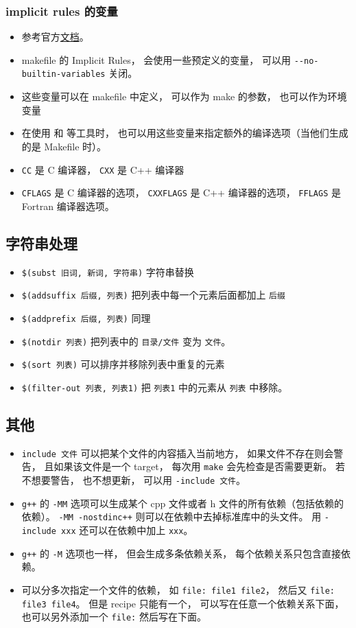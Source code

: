 \subsubsection{implicit rules 的变量}
\begin{itemize}
\item 参考官方\href{https://www.gnu.org/software/make/manual/html_node/Implicit-Variables.html}{文档}。
\item makefile 的 Implicit Rules， 会使用一些预定义的变量， 可以用 \verb`--no-builtin-variables` 关闭。
\item 这些变量可以在 makefile 中定义， 可以作为 make 的参数， 也可以作为环境变量
\item 在使用  和  等工具时， 也可以用这些变量来指定额外的编译选项（当他们生成的是 Makefile 时）。
\item \verb`CC` 是 C 编译器， \verb`CXX` 是 C++ 编译器
\item \verb`CFLAGS` 是 C 编译器的选项， \verb`CXXFLAGS` 是 C++ 编译器的选项， \verb`FFLAGS` 是 Fortran 编译器选项。
\end{itemize}

\subsection{字符串处理}
\begin{itemize}
\item \verb`$(subst 旧词, 新词, 字符串)` 字符串替换
\item \verb`$(addsuffix 后缀, 列表)` 把列表中每一个元素后面都加上 \verb`后缀`
\item \verb`$(addprefix 后缀, 列表)` 同理
\item \verb`$(notdir 列表)` 把列表中的 \verb`目录/文件` 变为 \verb`文件`。
\item \verb`$(sort 列表)` 可以排序并移除列表中重复的元素
\item \verb`$(filter-out 列表, 列表1)` 把 \verb`列表1` 中的元素从 \verb`列表` 中移除。
\end{itemize}


\subsection{其他}
\begin{itemize}
\item \verb`include 文件` 可以把某个文件的内容插入当前地方， 如果文件不存在则会警告， 且如果该文件是一个 target， 每次用 \verb`make` 会先检查是否需要更新。 若不想要警告， 也不想更新， 可以用 \verb`-include 文件`。
\item \verb`g++` 的 \verb`-MM` 选项可以生成某个 cpp 文件或者 h 文件的所有依赖（包括依赖的依赖）。 \verb`-MM -nostdinc++` 则可以在依赖中去掉标准库中的头文件。 用 \verb`-include xxx` 还可以在依赖中加上 \verb`xxx`。
\item \verb`g++` 的 \verb`-M` 选项也一样， 但会生成多条依赖关系， 每个依赖关系只包含直接依赖。
\item 可以分多次指定一个文件的依赖， 如 \verb`file: file1 file2`， 然后又 \verb`file: file3 file4`。 但是 recipe 只能有一个， 可以写在任意一个依赖关系下面， 也可以另外添加一个 \verb`file:` 然后写在下面。
\end{itemize}
